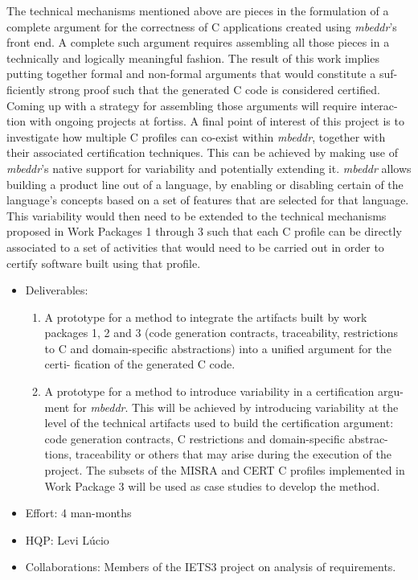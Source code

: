 The technical mechanisms mentioned above are pieces in the formulation of a
complete argument for the correctness of C applications created using
\emph{mbeddr}’s front end. A complete such argument requires assembling all
those pieces in a technically and logically meaningful fashion. The result of
this work implies putting together formal and non-formal arguments that would
constitute a suf- ficiently strong proof such that the generated C code is
considered certified.
Coming up with a strategy for assembling those arguments will require interac-
tion with ongoing projects at fortiss. A final point of interest of this project is to
investigate how multiple C profiles can co-exist within \emph{mbeddr}, together
with their associated certification techniques. This can be achieved by making
use of \emph{mbeddr}’s native support for variability and potentially extending
it. \emph{mbeddr} allows building a product line out of a language, by enabling
or disabling certain of the language’s concepts based on a set of features that
are selected for that language.
This variability would then need to be extended to the technical mechanisms
proposed in Work Packages 1 through 3 such that each C profile can be directly
associated to a set of activities that would need to be carried out in order to
certify software built using that profile.

\begin{itemize}
  \item Deliverables:
  \begin{enumerate}
    \item A prototype for a method to integrate the artifacts built by work
    packages 1, 2 and 3 (code generation contracts, traceability, restrictions to C and
domain-specific abstractions) into a unified argument for the certi- fication of
the generated C code.
\item A prototype for a method to introduce variability in a certification argu-
ment for \emph{mbeddr}. This will be achieved by introducing variability at the level
of the technical artifacts used to build the certification argument: code
generation contracts, C restrictions and domain-specific abstrac- tions,
traceability or others that may arise during the execution of the project. The
subsets of the MISRA and CERT C profiles implemented in Work Package 3 will be
used as case studies to develop the method.
  \end{enumerate}
  \item Effort: 4 man-months
  \item HQP: Levi L\'ucio
  \item Collaborations: Members of the IETS3 project on analysis of
  requirements.
\end{itemize}
